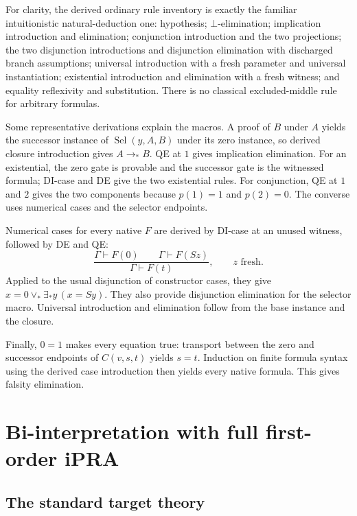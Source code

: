 \documentclass[11pt]{article}
\theoremstyle{definition}\newtheorem{definition}[theorem]{Definition}
\theoremstyle{remark}\newtheorem{remark}[theorem]{Remark}
\newcommand{\Sel}{\operatorname{Sel}}
\begin{document}
For clarity, the derived ordinary rule inventory is exactly the familiar
intuitionistic natural-deduction one: hypothesis; $\bot$-elimination;
implication introduction and elimination; conjunction introduction and
the two projections; the two disjunction introductions and disjunction
elimination with discharged branch assumptions; universal introduction
with a fresh parameter and universal instantiation; existential
introduction and elimination with a fresh witness; and equality
reflexivity and substitution. There is no classical excluded-middle
rule for arbitrary formulas.

Some representative derivations explain the macros. A proof of $B$
under $A$ yields the successor instance of $\Sel(y,A,B)$ under its
zero instance, so derived closure introduction gives $A\to_*B$.
QE at $1$ gives implication elimination. For an existential, the zero
gate is provable and the successor gate is the witnessed formula;
DI-case and DE give the two existential rules. For conjunction, QE at
$1$ and $2$ gives the two components because $p(1)=1$ and $p(2)=0$.
The converse uses numerical cases and the selector endpoints.

Numerical cases for every native $F$ are derived by DI-case at an
unused witness, followed by DE and QE:
\[
 \frac{\Gamma\vdash F(0)\qquad\Gamma\vdash F(Sz)}
      {\Gamma\vdash F(t)},\qquad z\text{ fresh}.
\]
Applied to the usual disjunction of constructor cases, they give
$x=0\vee_*\exists_*y\,(x=Sy)$. They also provide disjunction
elimination for the selector macro. Universal introduction and
elimination follow from the base instance and the closure.

Finally, $0=1$ makes every equation true: transport between the zero
and successor endpoints of $C(v,s,t)$ yields $s=t$. Induction on
finite formula syntax using the derived case introduction then yields
every native formula. This gives falsity elimination.

\section{Bi-interpretation with full first-order iPRA}

\subsection{The standard target theory}
\end{document}
